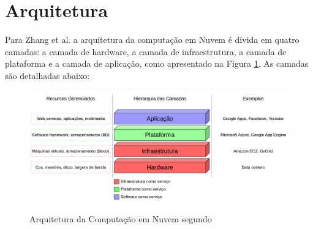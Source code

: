\section{Arquitetura} \label{cloud:arch}

Para Zhang et al.\citeyearpar{stateOfArt:2010} a arquitetura da computação em Nuvem é divida em quatro camadas: a camada de hardware, a camada de infraestrutura, a camada de plataforma e a camada de aplicação, como apresentado na Figura \ref{architecture1}. As camadas são detalhadas abaixo:

\begin{figure}[htbp]
  \centering \includegraphics[scale=.4]{imgs/architecture1.png}
\caption{Arquitetura da Computação em Nuvem segundo~\citep{stateOfArt:2010}} 
\label{architecture1}
\end{figure}

